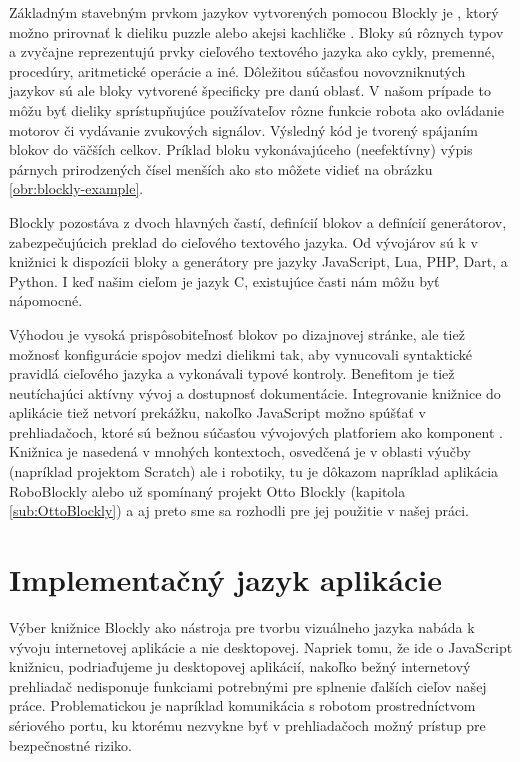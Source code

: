 Základným stavebným prvkom jazykov vytvorených pomocou Blockly je , ktorý možno prirovnať k dieliku puzzle alebo akejsi kachličke \cite{pasternak2017tips}. Bloky sú rôznych typov a zvyčajne reprezentujú prvky cieľového textového jazyka ako cykly, premenné, procedúry, aritmetické operácie a iné. Dôležitou súčasťou novovzniknutých jazykov sú ale bloky vytvorené špecificky pre danú oblasť. V našom prípade to môžu byť dieliky sprístupňujúce používateľov rôzne funkcie robota ako ovládanie motorov či vydávanie zvukových signálov. Výsledný kód je tvorený spájaním blokov do väčších celkov. Príklad bloku vykonávajúceho (neefektívny) výpis párnych prirodzených čísel menších ako sto môžete vidieť na obrázku \ref{obr:blockly-example}.

Blockly pozostáva z dvoch hlavných častí, definícií blokov a definícií generátorov, zabezpečujúcich preklad do cieľového textového jazyka. Od vývojárov sú k v knižnici k dispozícii  bloky a generátory pre jazyky JavaScript, Lua, PHP, Dart, a Python. I keď našim cieľom je jazyk C, existujúce časti nám môžu byť nápomocné.

Výhodou je vysoká prispôsobiteľnosť blokov po dizajnovej stránke, ale tiež možnosť konfigurácie spojov medzi dielikmi tak, aby vynucovali syntaktické pravidlá cieľového jazyka a vykonávali typové kontroly. Benefitom je tiež neutíchajúci aktívny vývoj a dostupnosť dokumentácie. Integrovanie knižnice do aplikácie tiež netvorí prekážku, nakoľko JavaScript možno spúšťať v prehliadačoch, ktoré sú bežnou súčasťou vývojových platforiem ako komponent . Knižnica je nasedená v mnohých kontextoch, osvedčená je v oblasti výučby (napríklad projektom Scratch) ale i robotiky, tu je dôkazom napríklad aplikácia RoboBlockly alebo už spomínaný projekt Otto Blockly (kapitola \ref{sub:OttoBlockly}) a aj preto sme sa rozhodli pre jej použitie v našej práci.


\section{Implementačný jazyk aplikácie}
Výber knižnice Blockly ako nástroja pre tvorbu vizuálneho jazyka nabáda k vývoju internetovej aplikácie a nie desktopovej. Napriek tomu, že ide o JavaScript knižnicu, podriaďujeme ju desktopovej aplikácií, nakoľko bežný internetový prehliadač nedisponuje funkciami potrebnými pre splnenie ďalších cieľov našej práce. Problematickou je napríklad komunikácia s robotom prostredníctvom sériového portu, ku ktorému nezvykne byť v prehliadačoch možný prístup pre bezpečnostné riziko. 

